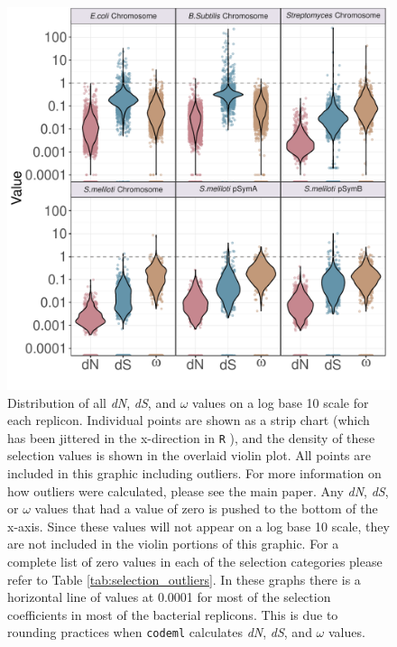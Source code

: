 \documentclass[11pt]{article}
\newcommand{\dn}{\textit{dN}\xspace}
\newcommand{\ds}{\textit{dS}\xspace}
\begin{document}
\begin{figure}[h]
	\centering
	\includegraphics[width=\textwidth]{./figs/ALL_BAC_dN_dS_omega_violinplots_22Sep20.pdf}
	\caption{\label{fig:box_plots} Distribution of all \dn, \ds, and $\omega$ values on a log base 10 scale for each replicon. Individual points are shown as a strip chart (which has been jittered in the x-direction in \texttt{R} \citep{Wickham2019}), and the density of these selection values is shown in the overlaid violin plot. All points are included in this graphic including outliers. For more information on how outliers were calculated, please see the main paper. Any \dn, \ds, or $\omega$ values that had a value of zero is pushed to the bottom of the x-axis. Since these values will not appear on a log base 10 scale, they are not included in the violin portions of this graphic. For a complete list of zero values in each of the selection categories please refer to Table \ref{tab:selection_outliers}. In these graphs there is a horizontal line of values at 0.0001 for most of the selection coefficients in most of the bacterial replicons. This is due to rounding practices when \texttt{codeml} \citep{Yang97} calculates \dn, \ds, and $\omega$ values.}
\end{figure}
\end{document}

